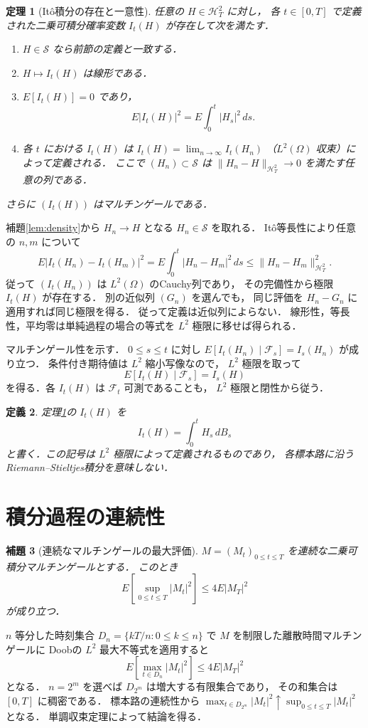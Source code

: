 \documentclass[a5paper,10pt,onecolumn]{jsarticle}
\makeatletter
\theoremstyle{mathnotetheorem}
\newtheorem{theorem}{定理}[section]
\newtheorem{definition}[theorem]{定義}
\newtheorem{lemma}[theorem]{補題}
\renewcommand{\proofname}{証明}
\renewenvironment{proof}[1][\proofname]{%
  \par\pushQED{\qed}\normalfont\topsep4\p@\@plus2\p@\relax
  \trivlist\item[\hskip\labelsep\bfseries #1]\ignorespaces
}{\popQED\endtrivlist\@endpefalse}
\newcommand{\norm}[1]{\lVert #1\rVert}
\makeatother
\begin{document}
\begin{theorem}[It\^o積分の存在と一意性]\label{thm:ito-existence}
任意の $H\in\mathcal H^2_T$ に対し，
各 $t\in[0,T]$ で定義された二乗可積分確率変数
$I_t(H)$ が存在して次を満たす．
\begin{enumerate}
\item $H\in\mathcal S$ なら前節の定義と一致する．
\item $H\mapsto I_t(H)$ は線形である．
\item $E[I_t(H)]=0$ であり，
\[
 E|I_t(H)|^2=E\int_0^t|H_s|^2\,ds.
\]
\item 各 $t$ における $I_t(H)$ は
$I_t(H)=\lim_{n\to\infty}I_t(H_n)$
（$L^2(\Omega)$ 収束）によって定義される．
ここで $(H_n)\subset\mathcal S$ は
$\norm{H_n-H}_{\mathcal H^2_T}\to0$ を満たす任意の列である．
\end{enumerate}
さらに $(I_t(H))$ はマルチンゲールである．
\end{theorem}
\begin{proof}
補題\ref{lem:density}から
$H_n\to H$ となる $H_n\in\mathcal S$ を取れる．
It\^o等長性により任意の $n,m$ について
\[
 E|I_t(H_n)-I_t(H_m)|^2
 =E\int_0^t|H_n-H_m|^2\,ds
 \le\norm{H_n-H_m}_{\mathcal H^2_T}^2.
\]
従って $(I_t(H_n))$ は $L^2(\Omega)$ のCauchy列であり，
その完備性から極限 $I_t(H)$ が存在する．
別の近似列 $(G_n)$ を選んでも，
同じ評価を $H_n-G_n$ に適用すれば同じ極限を得る．
従って定義は近似列によらない．
線形性，等長性，平均零は単純過程の場合の等式を
$L^2$ 極限に移せば得られる．

マルチンゲール性を示す．
$0\le s\le t$ に対し
$E[I_t(H_n)\mid\mathcal F_s]=I_s(H_n)$ が成り立つ．
条件付き期待値は $L^2$ 縮小写像なので，
$L^2$ 極限を取って
\[
 E[I_t(H)\mid\mathcal F_s]=I_s(H)
\]
を得る．各 $I_t(H)$ は $\mathcal F_t$ 可測であることも，
$L^2$ 極限と閉性から従う．
\end{proof}

\begin{definition}
定理\ref{thm:ito-existence}の $I_t(H)$ を
\[
 I_t(H)=\int_0^tH_s\,dB_s
\]
と書く．この記号は $L^2$ 極限によって定義されるものであり，
各標本路に沿うRiemann--Stieltjes積分を意味しない．
\end{definition}

\section{積分過程の連続性}

\begin{lemma}[連続なマルチンゲールの最大評価]\label{lem:cont-doob}
$M=(M_t)_{0\le t\le T}$ を連続な二乗可積分マルチンゲールとする．
このとき
\[
 E\left[\sup_{0\le t\le T}|M_t|^2\right]
 \le4E|M_T|^2
\]
が成り立つ．
\end{lemma}
\begin{proof}
$n$ 等分した時刻集合 $D_n=\{kT/n:0\le k\le n\}$
で $M$ を制限した離散時間マルチンゲールに
Doobの $L^2$ 最大不等式を適用すると
\[
 E\left[\max_{t\in D_n}|M_t|^2\right]
 \le4E|M_T|^2
\]
となる．
$n=2^m$ を選べば $D_{2^m}$ は増大する有限集合であり，
その和集合は $[0,T]$ に稠密である．
標本路の連続性から
$\max_{t\in D_{2^m}}|M_t|^2
 \uparrow\sup_{0\le t\le T}|M_t|^2$ となる．
単調収束定理によって結論を得る．
\end{proof}
\end{document}
